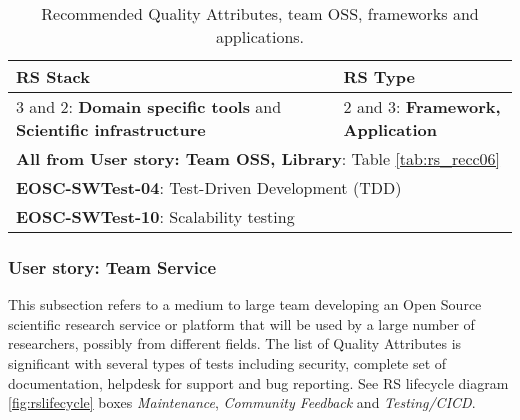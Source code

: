 \begin{center}
\begin{table}[h]

  \small
  \begin{tabular}{|p{0.65\linewidth}|p{0.35\linewidth}|} \hline

    \textbf{RS Stack} & \textbf{RS Type} \\ \hline \hline
    3 and 2: \textbf{Domain specific tools} and  \textbf{Scientific infrastructure} &
    2 and 3: \textbf{Framework, Application} \\ \hline \hline
    \multicolumn{2}{|l|}{\textbf{All from User story: Team OSS, Library}: Table \ref{tab:rs_recc06}} \\ \hline
    \multicolumn{2}{|l|}{\textbf{EOSC-SWTest-04}: Test-Driven Development (TDD)} \\ \hline
    \multicolumn{2}{|l|}{\textbf{EOSC-SWTest-10}: Scalability testing} \\ \hline

  \end{tabular}
  \caption{Recommended Quality Attributes, team OSS, frameworks and applications.}
  \label{tab:rs_recc07}
\end{table}
\end{center}

\subsubsection{User story: Team Service}

This subsection refers to a medium to large team developing an Open Source scientific research service or platform that will be used by a large number of researchers, possibly from different fields. The list of Quality Attributes is significant with several types of tests including security, complete set of documentation, helpdesk for support and bug reporting. See RS lifecycle diagram \ref{fig:rslifecycle} boxes \textit{Maintenance}, \textit{Community Feedback} and \textit{Testing/CICD}.

